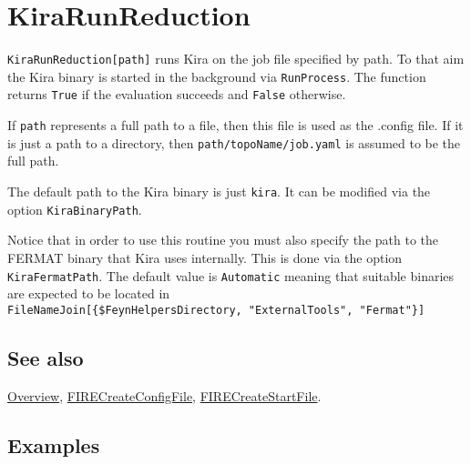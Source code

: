 \documentclass[../FeynHelpersManual.tex]{subfiles}
\begin{document}
\begin{Shaded}
\begin{Highlighting}[]
 
\end{Highlighting}
\end{Shaded}

\hypertarget{kirarunreduction}{
\section{KiraRunReduction}\label{kirarunreduction}}

\texttt{KiraRunReduction[\allowbreak{}path]} runs Kira on the job file
specified by path. To that aim the Kira binary is started in the
background via \texttt{RunProcess}. The function returns \texttt{True}
if the evaluation succeeds and \texttt{False} otherwise.

If \texttt{path} represents a full path to a file, then this file is
used as the .config file. If it is just a path to a directory, then
\texttt{path/topoName/job.yaml} is assumed to be the full path.

The default path to the Kira binary is just \texttt{kira}. It can be
modified via the option \texttt{KiraBinaryPath}.

Notice that in order to use this routine you must also specify the path
to the FERMAT binary that Kira uses internally. This is done via the
option \texttt{KiraFermatPath}. The default value is \texttt{Automatic}
meaning that suitable binaries are expected to be located in
\texttt{FileNameJoin[\allowbreak{}\{\allowbreak{}\$FeynHelpersDirectory,\ \allowbreak{}"ExternalTools",\ \allowbreak{}"Fermat"\}]}

\subsection{See also}

\hyperlink{toc}{Overview},
\hyperlink{firecreateconfigfile}{FIRECreateConfigFile},
\hyperlink{firecreatestartfile}{FIRECreateStartFile}.

\subsection{Examples}

\begin{Shaded}
\begin{Highlighting}[]
\OperatorTok{[}\OperatorTok{[\{}\OperatorTok{,} \OperatorTok{,} \OperatorTok{,} \OperatorTok{\}],}\OtherTok{{-}\textgreater{}} \OperatorTok{]}
\end{Highlighting}
\end{Shaded}
\end{document}
